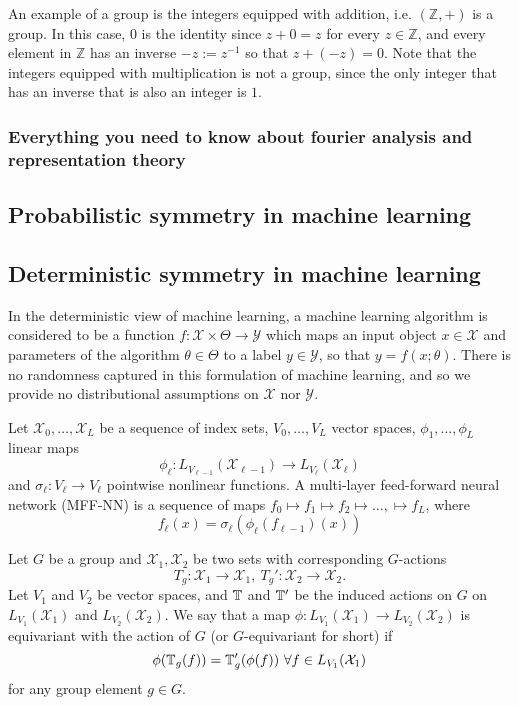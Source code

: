 \begin{example}
An example of a group is the integers equipped with addition, i.e. $(\mathbb{Z}, +)$ is a group.
In this case, $0$ is the identity since $z + 0 = z$ for every $z \in \mathbb{Z}$, and every element in $\mathbb{Z}$ has an inverse $-z := z^{-1}$ so that $z + (-z) = 0$.
Note that the integers equipped with multiplication is not a group, since the only integer that has an inverse that is also an integer is $1$.
\end{example}


\subsubsection{Everything you need to know about fourier analysis and representation theory}

\subsection{Probabilistic symmetry in machine learning}

\subsection{Deterministic symmetry in machine learning}
In the deterministic view of machine learning, a machine learning algorithm is considered to be a function $f: \mathcal{X} \times \Theta \to \mathcal{Y}$ which maps an input object $x \in \mathcal{X}$ and parameters of the algorithm $\theta \in \Theta$ to a label $y \in \mathcal{Y}$, so that $y = f(x;\theta)$.
There is no randomness captured in this formulation of machine learning, and so we provide no distributional assumptions on $\mathcal{X}$ nor $\mathcal{Y}$.

\begin{definition} \label{def:nn}
	Let $\mathcal{X}_0, \ldots, \mathcal{X}_L$ be a sequence of index sets, $V_0, \ldots, V_L$ vector spaces, $\phi_1, \ldots, \phi_L$ linear maps
	$$
		\phi_\ell: L_{V_{\ell-1}}(\mathcal{X}_{\ell - 1}) \to L_{V_{\ell}}(\mathcal{X}_{\ell})
	$$
	and $\sigma_{\ell}: V_{\ell} \to V_{\ell}$ pointwise nonlinear functions.
	A multi-layer feed-forward neural network (MFF-NN) is a sequence of maps $f_0 \mapsto f_1 \mapsto f_2 \mapsto \ldots, \mapsto f_L$, where
	$$
		f_{\ell}(x) = \sigma_{\ell}( \phi_{\ell}(f_{\ell-1})(x))
	$$
\end{definition}

\begin{definition} \label{def:equi_nn}
	Let $G$ be a group and $\mathcal{X}_1, \mathcal{X}_2$ be two sets with corresponding $G$-actions
	$$
		T_g: \mathcal{X}_1 \to \mathcal{X}_1,\ T_g' : \mathcal{X}_2 \to \mathcal{X}_2.
	$$
	Let $V_1$ and $V_2$ be vector spaces, and $\mathbb{T}$ and $\mathbb{T}'$ be the induced actions on $G$ on $L_{V_1}(\mathcal{X}_1)$ and $L_{V_2}(\mathcal{X}_2)$.
	We say that a map $\phi: L_{V_1}(\mathcal{X}_1) \to L_{V_2}(\mathcal{X}_2)$ is equivariant with the action of $G$ (or $G$-equivariant for short) if
	$$
		\phi(\mathbb{T}_g(f)) = \mathbb{T}'_g(\phi(f))\ \forall f \in L_{V_1}(\mathcal{X}_1)
	$$
	for any group element $g \in G$.
\end{definition}

